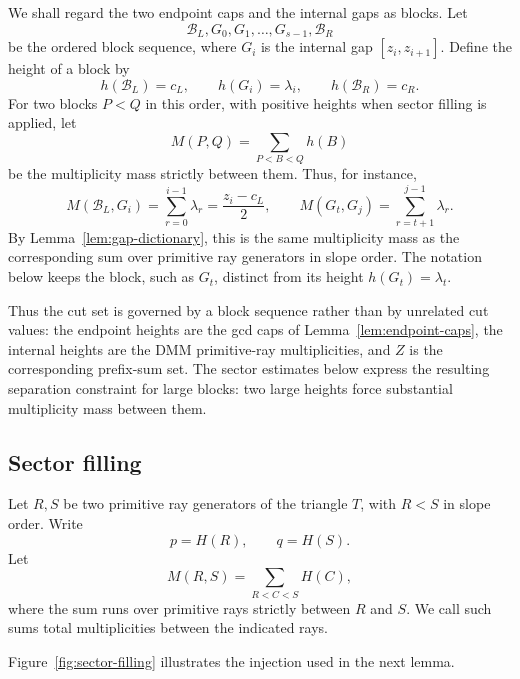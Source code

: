 \documentclass[11pt]{article}
\begin{document}
We shall regard the two endpoint caps and the internal gaps as blocks.  Let
\[
        \mathcal B_L,
        G_0,G_1,\ldots,G_{s-1},
        \mathcal B_R
\]
be the ordered block sequence, where $G_i$ is the internal gap $[z_i,z_{i+1}]$.  Define the height of a block by
\[
        h(\mathcal B_L)=c_L,
        \qquad
        h(G_i)=\lambda_i,
        \qquad
        h(\mathcal B_R)=c_R.
\]
For two blocks $P<Q$ in this order, with positive heights when sector filling is applied, let
\[
        M(P,Q)=\sum_{P<B<Q}h(B)
\]
be the multiplicity mass strictly between them.  Thus, for instance,
\[
        M(\mathcal B_L,G_i)=\sum_{r=0}^{i-1}\lambda_r=\frac{z_i-c_L}{2},
        \qquad
        M(G_t,G_j)=\sum_{r=t+1}^{j-1}\lambda_r.
\]
By Lemma~\ref{lem:gap-dictionary}, this is the same multiplicity mass as the corresponding sum over primitive ray generators in slope order.  The notation below keeps the block, such as $G_t$, distinct from its height $h(G_t)=\lambda_t$.

Thus the cut set is governed by a block sequence rather than by unrelated cut values: the endpoint heights are the gcd caps of Lemma~\ref{lem:endpoint-caps}, the internal heights are the DMM primitive-ray multiplicities, and $Z$ is the corresponding prefix-sum set.  The sector estimates below express the resulting separation constraint for large blocks: two large heights force substantial multiplicity mass between them.

\subsection{Sector filling}\label{sec:first-family-sector}

Let $R,S$ be two primitive ray generators of the triangle $T$, with $R<S$ in slope order.  Write
\[
        p=H(R),
        \qquad
        q=H(S).
\]
Let
\[
        M(R,S)=\sum_{R<C<S}H(C),
\]
where the sum runs over primitive rays strictly between $R$ and $S$.  We call such sums total multiplicities between the indicated rays.

Figure~\ref{fig:sector-filling} illustrates the injection used in the next lemma.
\end{document}
